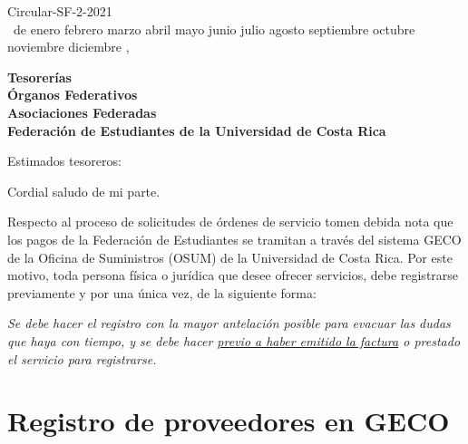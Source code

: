 \documentclass[12pt]{article}
\newcommand{\MONTH}{%
  \ifcase\the\month
  \or enero%
  \or febrero%
  \or marzo%
  \or abril%
  \or mayo%
  \or junio%
  \or julio%
  \or agosto%
  \or septiembre%
  \or octubre%
  \or noviembre%
  \or diciembre%
  \fi}
\newenvironment{significant}{\begin{center}\begin{minipage}{0.9\textwidth}\centering\em}{\end{minipage}\end{center}}
\begin{document}
\begin{flushright}
  Circular-SF-2-2021\\
  \medskip
  \the\day\ de \MONTH, \the\year
\end{flushright}
\medskip
\begin{flushleft}\begin{spacing}{1}
  \textbf{Tesorerías\\
  Órganos Federativos\\
  Asociaciones Federadas\\
  Federación de Estudiantes de la Universidad de Costa Rica}
\end{spacing}\end{flushleft}

\noindent Estimados tesoreros:\par

Cordial saludo de mi parte.\par
Respecto al proceso de solicitudes de órdenes de servicio tomen debida nota que los pagos de la Federación de Estudiantes se tramitan a través del sistema GECO de la Oficina de
Suministros (OSUM) de la Universidad de Costa Rica. Por este motivo, toda persona física o jurídica que
desee ofrecer servicios, debe registrarse previamente y por una única vez, de la siguiente forma: 

\begin{significant}
Se debe hacer el registro con la mayor antelación posible para evacuar las dudas que haya con tiempo, y
se debe hacer \underline{previo a haber emitido la factura} o prestado el servicio para registrarse.
\end{significant}


\section{Registro de proveedores en GECO}
\end{document}
